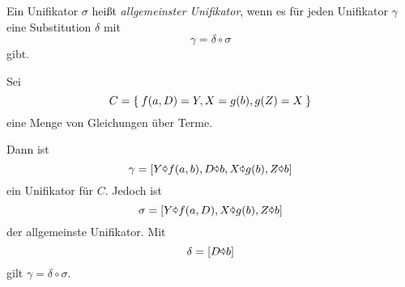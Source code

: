 \begin{definition}%
    Ein Unifikator $\sigma$ heißt \textit{allgemeinster Unifikator}, wenn 
    es für jeden Unifikator $\gamma$ eine Substitution $\delta$ mit
    \[\gamma = \delta \circ \sigma\]
    gibt.
\end{definition}

\begin{beispiel}
    Sei
    \[C = \Set{f(a,D) = Y, X = g(b), g(Z) = X}\]
    eine Menge von Gleichungen über Terme.

    Dann ist 
    \[\gamma = [Y \text{\pointer} f(a,b), D \text{\pointer} b, X \text{\pointer} g(b), Z \text{\pointer} b]\]
    ein Unifikator für $C$. Jedoch ist
    \[\sigma = [Y \text{\pointer} f(a,D), X \text{\pointer} g(b), Z \text{\pointer} b]\]
    der allgemeinste Unifikator. Mit
    \[\delta = [D \text{\pointer} b]\]
    gilt $\gamma = \delta \circ \sigma$.
\end{beispiel}

